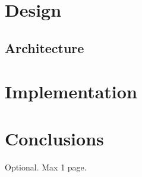 \documentclass[12pt,a4paper,openright,twoside]{book}
\begin{document}








\chapter{Design}\label{chap:design}

\section{Architecture}






\chapter{Implementation}\label{chap:implementation}





\chapter{Conclusions}
\label{chap:conclusions}




\backmatter

\nocite{*} %




\begin{acknowledgements} %
Optional. Max 1 page.
\end{acknowledgements}
\end{document}
